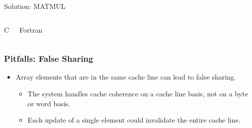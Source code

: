 \documentclass[c,mathserif,compress,xcolor=svgnames]{beamer}
\newenvironment{eblock}[0]
{
\begin{beamerboxesrounded}[upper=uppercol2,lower=lowercol2,shadow=true]}
{\end{beamerboxesrounded}}
\begin{document}
\begin{frame}{\small Solution: MATMUL}
  \begin{columns}
    \begin{eblock}{C}
      
    \end{eblock}
    \begin{eblock}{Fortran}
      
    \end{eblock}
  \end{columns}
\end{frame}

\begin{frame}[fragile]
  \frametitle{\small Pitfalls: False Sharing}
  \begin{itemize}
    \item Array elements that are in the same cache line can lead to false sharing.
    \begin{itemize}
      \item The system handles cache coherence on a cache line basis, not on a byte or word basis.
      \item Each update of a single element could invalidate the entire cache line.
    \end{itemize}
  \end{itemize}
  \begin{columns}
    \begin{eblock}{}
      
    \end{eblock}
  \end{columns}
\end{frame}
\end{document}
